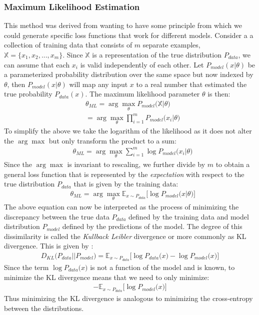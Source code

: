 \documentclass[14pt]{extarticle}
\numberwithin{equation}{section}
\begin{document}
		\subsubsection{Maximum Likelihood Estimation}
		This method was derived from wanting to have some principle from which we could generate specific loss functions that work for different models. Consider a a collection of training data that consists of $m$ separate examples, $\mathbb{X} = \{x_1, x_2, ..., x_m\}$. Since $\mathbb{X}$ is a representation of the true distribution $P_{data}$, we can assume that each $x_i$ is valid independently of each other. Let $P_{model}(x|\theta)$ be a parameterized probability distribution over the same space but now indexed by $\theta$, then $P_{model}(x|\theta)$ will map any input $x$ to a real number that estimated the true probability $P_{data}(x)$. The maximum likelihood parameter $\theta$ is then:
		\begin{align}
		&\theta_{ML} = \arg\max_{\theta}P_{model}\big(\mathbb{X}|\theta\big)\nonumber\\
		& = \arg\max_{\theta}\prod_{i=1}^{m}P_{model}\big(x_i|\theta\big)
		\end{align}		
		To simplify the above we take the logarithm of the likelihood as it does not alter the $\arg\max$ but only transform the product to a sum:
		\begin{align}
		& \theta_{ML}=\arg\max_{\theta}\sum_{i=1}^{m}\log P_{model}\big(x_i|\theta\big)
		\end{align}
		Since the $\arg\max$ is invariant to rescaling, we further divide by $m$ to obtain a general loss function that is represented by the \textit{expectation} with respect to the true distribution $P_{data}$ that is given by the training data:
		\begin{align}
		& \theta_{ML} = \arg\max_{\theta}\mathbb{E}_{x\sim P_{data}}\big[\log P_{model}\big(x|\theta\big)\big]
		\end{align}
		The above equation can now be interpreted as the process of minimizing the discrepancy between the true data $P_{data}$ defined by the training data and model distribution $P_{model}$ defined by the predictions of the model. The degree of this dissimilarity is called the \textit{Kullback Leibler} divergence or more commonly as KL divergence. This is given by :
		\begin{align}
		D_{KL}\big(P_{data}||P_{model} \big) = \mathbb{E}_{x\sim P_{data}}\big[\log P_{data}\big(x\big) - \log P_{model}\big(x\big)\big]
		\end{align}
		Since the term $\log P_{data}\big(x\big)$ is not a function of the model and is known, to minimize the KL divergence means that we need to only minimize:
		\begin{align}
		- \mathbb{E}_{x \sim P_{data}}\big[\log P_{model}\big(x\big)\big]
		\end{align}
		Thus minimizing the KL divergence is analogous to minimizing the cross-entropy between the distributions.
\end{document}
